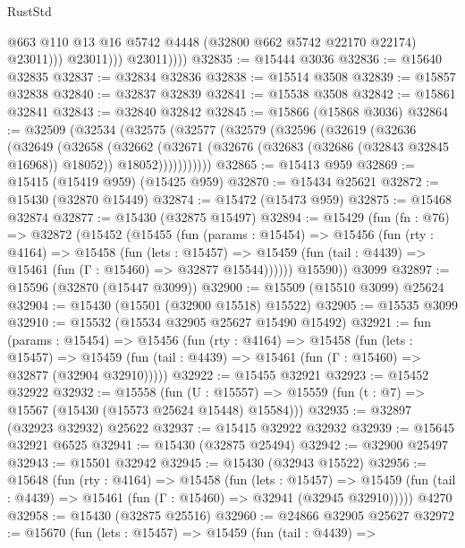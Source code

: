 \begin{lexlean}{RustStd}
\begin{coremodule}
{\begin{coremodule}
{{{{{{{{{{{{{{{{{{{{{{{{{{{{{{{{{{{{{{{{{{{{{{{{{{{{{{{{{{{{                        @663
                        @110
                        @13
                        @16
                        @5742
                        @4448
                        (@32800 @662 @5742 @22170 @22174)
                        @23011)))
                  @23011)))
            @23011))))
@32835 := @15444 @3036
@32836 := @15640 @32835
@32837 := @32834 @32836
@32838 := @15514 @3508
@32839 := @15857 @32838
@32840 := @32837 @32839
@32841 := @15538 @3508
@32842 := @15861 @32841
@32843 := @32840 @32842
@32845 := @15866 (@15868 @3036)
@32864 := @32509
    (@32534
      (@32575
        (@32577
          (@32579
            (@32596
              (@32619
                (@32636
                  (@32649
                    (@32658
                      (@32662
                        (@32671
                          (@32676 (@32683 (@32686 (@32843 @32845 @16968)) @18052))
                          @18052)))))))))))
@32865 := @15413 @959
@32869 := @15415 (@15419 @959) (@15425 @959)
@32870 := @15434 @25621
@32872 := @15430 (@32870 @15449)
@32874 := @15472 (@15473 @959)
@32875 := @15468 @32874
@32877 := @15430 (@32875 @15497)
@32894 := @15429
    (fun (fn : @76) =>
    @32872
      (@15452
        (@15455
          (fun (params : @15454) =>
          @15456
            (fun (rty : @4164) =>
            @15458
              (fun (lets : @15457) =>
              @15459 (fun (tail : @4439) => @15461 (fun (Γ : @15460) => @32877 @15544))))))
        @15590))
    @3099
@32897 := @15596 (@32870 (@15447 @3099))
@32900 := @15509 (@15510 @3099) @25624
@32904 := @15430 (@15501 (@32900 @15518) @15522)
@32905 := @15535 @3099
@32910 := @15532 (@15534 @32905 @25627 @15490 @15492)
@32921 := fun (params : @15454) =>
  @15456
    (fun (rty : @4164) =>
    @15458
      (fun (lets : @15457) =>
      @15459 (fun (tail : @4439) => @15461 (fun (Γ : @15460) => @32877 (@32904 @32910)))))
@32922 := @15455 @32921
@32923 := @15452 @32922
@32932 := @15558
    (fun (U : @15557) => @15559 (fun (t : @7) => @15567 (@15430 (@15573 @25624 @15448) @15584)))
@32935 := @32897 (@32923 @32932) @25622
@32937 := @15415 @32922 @32932
@32939 := @15645 @32921 @6525
@32941 := @15430 (@32875 @25494)
@32942 := @32900 @25497
@32943 := @15501 @32942
@32945 := @15430 (@32943 @15522)
@32956 := @15648
    (fun (rty : @4164) =>
    @15458
      (fun (lets : @15457) =>
      @15459 (fun (tail : @4439) => @15461 (fun (Γ : @15460) => @32941 (@32945 @32910)))))
    @4270
@32958 := @15430 (@32875 @25516)
@32960 := @24866 @32905 @25627
@32972 := @15670
    (fun (lets : @15457) =>
    @15459
      (fun (tail : @4439) =>
}}}}}}}}}}}}}}}}}}}}}}}}}}}}}}}}}}}}}}}}}}}}}}}}}}}}}}}}}}}}
\end{coremodule}}
\end{coremodule}
\end{lexlean}
